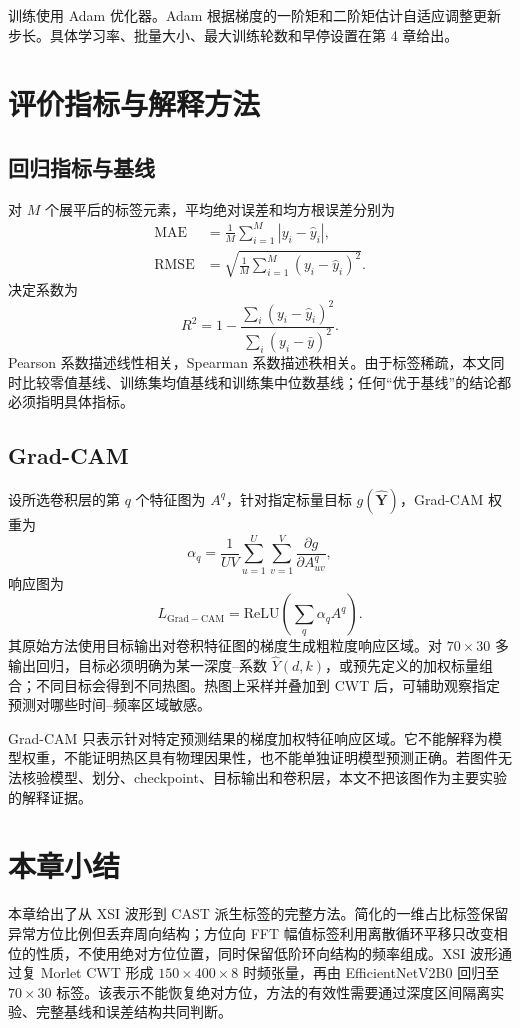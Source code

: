 训练使用 Adam 优化器。Adam 根据梯度的一阶矩和二阶矩估计自适应调整更新步长\cite{Kingma2014Adam}。具体学习率、批量大小、最大训练轮数和早停设置在第 4 章给出。

\section{评价指标与解释方法}

\subsection{回归指标与基线}

对 $M$ 个展平后的标签元素，平均绝对误差和均方根误差分别为
\begin{align}
  \mathrm{MAE} &= \frac{1}{M}\sum_{i=1}^{M}|y_i-\hat y_i|,\\
  \mathrm{RMSE} &= \sqrt{\frac{1}{M}\sum_{i=1}^{M}(y_i-\hat y_i)^2}.
\end{align}
决定系数为
\begin{equation}
  R^2=1-\frac{\sum_i(y_i-\hat y_i)^2}
  {\sum_i(y_i-\bar y)^2}.
\end{equation}
Pearson 系数描述线性相关，Spearman 系数描述秩相关。由于标签稀疏，本文同时比较零值基线、训练集均值基线和训练集中位数基线；任何“优于基线”的结论都必须指明具体指标。

\subsection{Grad-CAM}

设所选卷积层的第 $q$ 个特征图为 $A^q$，针对指定标量目标 $g(\hat{\mathbf{Y}})$，Grad-CAM 权重为
\begin{equation}
  \alpha_q=\frac{1}{UV}\sum_{u=1}^{U}\sum_{v=1}^{V}
  \frac{\partial g}{\partial A^q_{uv}},
\end{equation}
响应图为
\begin{equation}
  L_{\mathrm{Grad-CAM}}=
  \mathrm{ReLU}\left(\sum_q\alpha_q A^q\right).
  \label{eq:gradcam}
\end{equation}
其原始方法使用目标输出对卷积特征图的梯度生成粗粒度响应区域\cite{Selvaraju2017GradCAM}。对 $70\times30$ 多输出回归，目标必须明确为某一深度--系数 $\hat Y(d,k)$，或预先定义的加权标量组合；不同目标会得到不同热图。热图上采样并叠加到 CWT 后，可辅助观察指定预测对哪些时间--频率区域敏感。

Grad-CAM 只表示针对特定预测结果的梯度加权特征响应区域。它不能解释为模型权重，不能证明热区具有物理因果性，也不能单独证明模型预测正确。若图件无法核验模型、划分、checkpoint、目标输出和卷积层，本文不把该图作为主要实验的解释证据。

\section{本章小结}

本章给出了从 XSI 波形到 CAST 派生标签的完整方法。简化的一维占比标签保留异常方位比例但丢弃周向结构；方位向 FFT 幅值标签利用离散循环平移只改变相位的性质，不使用绝对方位位置，同时保留低阶环向结构的频率组成。XSI 波形通过复 Morlet CWT 形成 $150\times400\times8$ 时频张量，再由 EfficientNetV2B0 回归至 $70\times30$ 标签。该表示不能恢复绝对方位，方法的有效性需要通过深度区间隔离实验、完整基线和误差结构共同判断。
